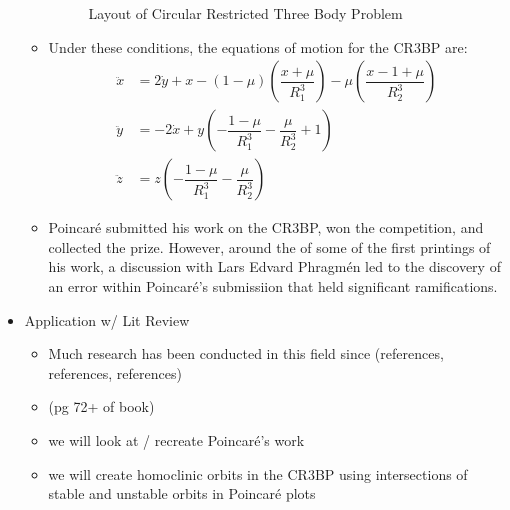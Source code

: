 \documentclass{article}
\begin{document}
\begin{itemize}
\begin{itemize}
\begin{figure}
	  	\caption{Layout of Circular Restricted Three Body Problem \cite{KoonLoMarsdenRoss2011}}
		\label{fig:CR3BP}
	  	\end{figure}
		\item Under these conditions, the equations of motion for the CR3BP are:
	  	\begin{align}
	  	\ddot{x} &=  2\dot{y} + x - (1-\mu)\left(\dfrac{x+\mu}{R_1^3}\right) - \mu\left(\dfrac{x-1+\mu}{R_2^3}\right)\\
		\ddot{y} &= - 2\dot{x} + y\left(-\dfrac{1-\mu}{R_1^3} - \dfrac{\mu}{R_2^3} + 1\right) \\
		\ddot{z} &= z\left(-\dfrac{1 - \mu}{R_1^3} - \dfrac{\mu}{R_2^3}\right)
		\end{align}
	  	\item Poincaré submitted his work on the CR3BP, won the competition, and collected the prize. However, around the of some of the first printings of his work, a discussion with Lars Edvard Phragmén led to the discovery of an error within Poincaré's submissiion that held significant ramifications.

	  \end{itemize}
	\item Application w/ Lit Review
	  \begin{itemize}
	  	\item \color{red}Much research has been conducted in this field since (references, references, references)\color{black}
	  	\item (pg 72+ of book)
	  	\item we will look at / recreate Poincaré's work
	  	\item we will create homoclinic orbits in the CR3BP using intersections of stable and unstable orbits in Poincaré plots
	  \end{itemize}
\end{itemize}



\end{document}
